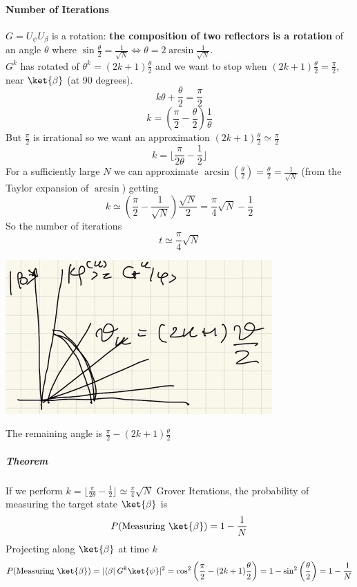 \documentclass[10pt]{report}
\begin{document}
\paragraph{Number of Iterations}
$G = U_\psi U_\beta$ is a rotation: \textbf{the composition of two reflectors is a rotation} of an angle $\theta$ where $\sin\frac{\theta}{2}=\frac{1}{\sqrt{N}}\Leftrightarrow\theta = 2\arcsin\frac{1}{\sqrt{N}}$.\\
$G^k$ has rotated of $\theta^k = (2k+1)\frac{\theta}{2}$ and we want to stop when $(2k+1)\frac{\theta}{2}=\frac{\pi}{2}$, near $\ket{\beta}$ (at 90 degrees).
$$k\theta + \frac{\theta}{2} = \frac{\pi}{2}$$
$$k = \left(\frac{\pi}{2}-\frac{\theta}{2}\right)\frac{1}{\theta}$$
But $\frac{\pi}{2}$ is irrational so we want an approximation
$(2k+1)\frac{\theta}{2}\simeq\frac{\pi}{2}$
$$k=\lfloor\frac{\pi}{2\theta}-\frac{1}{2}\rfloor$$
For a sufficiently large $N$ we can approximate $\arcsin\left(\frac{\theta}{2}\right) = \frac{\theta}{2} = \frac{1}{\sqrt{N}}$ (from the Taylor expansion of $\arcsin$) getting
$$k\simeq\left(\frac{\pi}{2}-\frac{1}{\sqrt{N}}\right)\frac{\sqrt{N}}{2} = \frac{\pi}{4}\sqrt{N}-\frac{1}{2}$$
So the number of iterations $$t\simeq\frac{\pi}{4}\sqrt{N}$$
\begin{center}
	\includegraphics[scale=0.5]{36.png}
\end{center}
The remaining angle is $\frac{\pi}{2}-(2k+1)\frac{\theta}{2}$
\subparagraph{Theorem} If we perform $k=\lfloor\frac{\pi}{2\theta}-\frac{1}{2}\rfloor\simeq\frac{\pi}{4}\sqrt{N}$ Grover Iterations, the probability of measuring the target state $\ket{\beta}$ is $$P(\hbox{Measuring }\ket{\beta}) = 1-\frac{1}{N}$$
Projecting along $\ket{\beta}$ at time $k$
$$P(\hbox{Measuring }\ket{\beta}) = |\langle\beta|\:G^k\ket{\psi}|^2 = \cos^2\left(\frac{\pi}{2}-(2k+1)\frac{\theta}{2}\right) = 1-\sin^2\left(\frac{\theta}{2}\right) = 1-\frac{1}{N}$$
\end{document}
